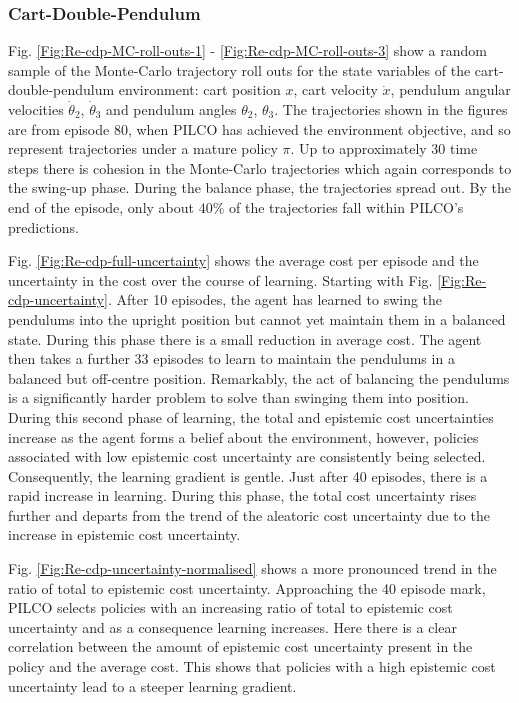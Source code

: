 \subsubsection{Cart-Double-Pendulum}
Fig. \ref{Fig:Re-cdp-MC-roll-outs-1} - \ref{Fig:Re-cdp-MC-roll-outs-3} show a random sample of the Monte-Carlo trajectory roll outs for the state variables of the cart-double-pendulum environment: cart position $x$, cart velocity $\dot x$, pendulum angular velocities $\dot{\theta}_{2}$, $\dot{\theta}_{3}$ and pendulum angles $\theta_{2}$, $\theta_{3}$. The trajectories shown in the figures are from episode 80, when PILCO has achieved the environment objective, and so represent trajectories under a mature policy $\pi$. Up to approximately 30 time steps there is cohesion in the Monte-Carlo trajectories which again corresponds to the swing-up phase. During the balance phase, the trajectories spread out. By the end of the episode, only about $40\%$ of the trajectories fall within PILCO's predictions. 

Fig. \ref{Fig:Re-cdp-full-uncertainty} shows the average cost per episode and the uncertainty in the cost over the course of learning. Starting with Fig. \ref{Fig:Re-cdp-uncertainty}. After 10 episodes, the agent has learned to swing the pendulums into the upright position but cannot yet maintain them in a balanced state. During this phase there is a small reduction in average cost. The agent then takes a further 33 episodes to learn to maintain the pendulums in a balanced but off-centre position. Remarkably, the act of balancing the pendulums is a significantly harder problem to solve than swinging them into position. During this second phase of learning, the total and epistemic cost uncertainties increase as the agent forms a belief about the environment, however, policies associated with low epistemic cost uncertainty are consistently being selected. Consequently, the learning gradient is gentle. Just after 40 episodes, there is a rapid increase in learning. During this phase, the total cost uncertainty rises further and departs from the trend  of the aleatoric cost uncertainty due to the increase in epistemic cost uncertainty. 

Fig. \ref{Fig:Re-cdp-uncertainty-normalised} shows a more pronounced trend in the ratio of total to epistemic cost uncertainty. Approaching the 40 episode mark, PILCO selects policies with an increasing ratio of total to epistemic cost uncertainty and as a consequence learning increases. Here there is a clear correlation between the amount of epistemic cost uncertainty present in the policy and the average cost. This shows that policies with a high epistemic cost uncertainty lead to a steeper learning gradient. 

